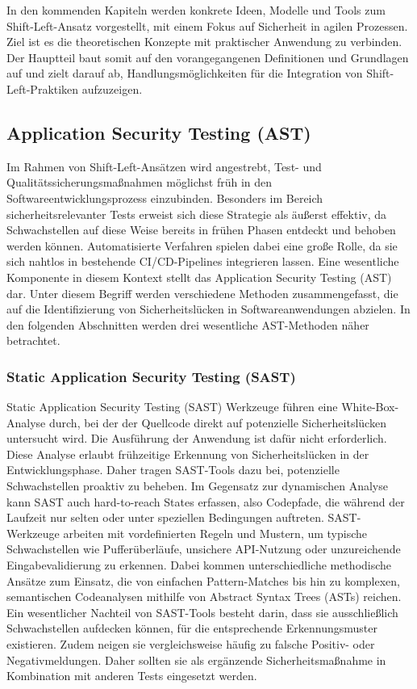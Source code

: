 \documentclass[acmtog]{acmart}
\begin{document}
In den kommenden Kapiteln werden konkrete Ideen, Modelle und Tools zum Shift-Left-Ansatz vorgestellt, mit einem Fokus auf Sicherheit in agilen Prozessen. Ziel ist es die theoretischen Konzepte mit praktischer Anwendung zu verbinden. Der Hauptteil baut somit auf den vorangegangenen Definitionen und Grundlagen auf und zielt darauf ab, Handlungsmöglichkeiten für die Integration von Shift-Left-Praktiken aufzuzeigen.





 
\subsection{Application Security Testing (AST)}
Im Rahmen von Shift-Left-Ansätzen wird angestrebt, Test- und Qualitätssicherungsmaßnahmen möglichst früh in den Softwareentwicklungsprozess einzubinden.
Besonders im Bereich sicherheitsrelevanter Tests erweist sich diese Strategie als äußerst effektiv, da Schwachstellen auf diese Weise bereits in frühen Phasen entdeckt und behoben werden können.
Automatisierte Verfahren spielen dabei eine große Rolle, da sie sich nahtlos in bestehende CI/CD-Pipelines integrieren lassen. 
Eine wesentliche Komponente in diesem Kontext stellt das Application Security Testing (AST) dar. 
Unter diesem Begriff werden verschiedene Methoden zusammengefasst, die auf die Identifizierung von Sicherheitslücken in Softwareanwendungen abzielen.
In den folgenden Abschnitten werden drei wesentliche AST-Methoden näher betrachtet.

\subsubsection{Static Application Security Testing (SAST)}
Static Application Security Testing (SAST) Werkzeuge führen eine White-Box-Analyse durch, bei der der Quellcode direkt auf potenzielle Sicherheitslücken untersucht wird.
Die Ausführung der Anwendung ist dafür nicht erforderlich.
Diese Analyse erlaubt frühzeitige Erkennung von Sicherheitslücken in der Entwicklungsphase. 
Daher tragen SAST-Tools dazu bei, potenzielle Schwachstellen proaktiv zu beheben. 
Im Gegensatz zur dynamischen Analyse kann SAST auch hard-to-reach States erfassen, also Codepfade, die während der Laufzeit nur selten oder unter speziellen Bedingungen auftreten.
SAST-Werkzeuge arbeiten mit vordefinierten Regeln und Mustern, um typische Schwachstellen wie Pufferüberläufe, unsichere API-Nutzung oder unzureichende Eingabevalidierung zu erkennen.
Dabei kommen unterschiedliche methodische Ansätze zum Einsatz, die von einfachen Pattern-Matches bis hin zu komplexen, semantischen Codeanalysen mithilfe von Abstract Syntax Trees (ASTs) reichen.
Ein wesentlicher Nachteil von SAST-Tools besteht darin, dass sie ausschließlich Schwachstellen aufdecken können, für die entsprechende Erkennungsmuster existieren.
Zudem neigen sie vergleichsweise häufig zu falsche Positiv- oder Negativmeldungen.
Daher sollten sie als ergänzende Sicherheitsmaßnahme in Kombination mit anderen Tests eingesetzt werden. \cite{chess_static_2004}
\end{document}
